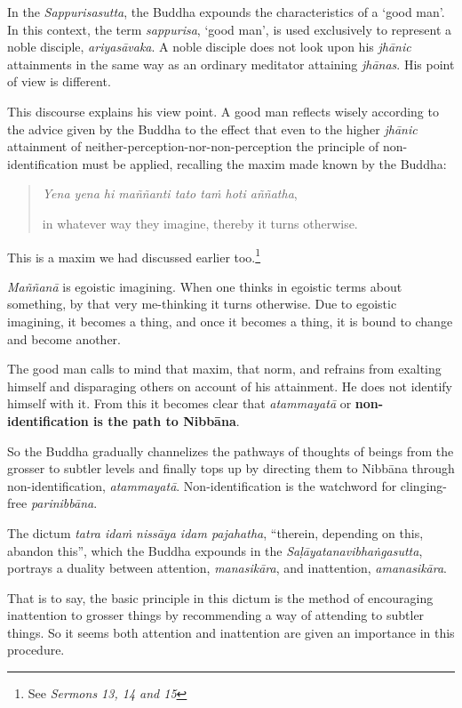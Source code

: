In the \emph{Sappurisasutta}, the Buddha expounds the characteristics of a `good man'. In this context, the term \emph{sappurisa}, `good man', is used exclusively to represent a noble disciple, \emph{ariyasāvaka}. A noble disciple does not look upon his \emph{jhānic} attainments in the same way as an ordinary meditator attaining \emph{jhānas}. His point of view is different.

This discourse explains his view point. A good man reflects wisely according to the advice given by the Buddha to the effect that even to the higher \emph{jhānic} attainment of neither-perception-nor-non-perception the principle of non-identification must be applied, recalling the maxim made known by the Buddha:

\begin{quote}
\emph{Yena yena hi maññanti tato taṁ hoti aññatha},

in whatever way they imagine, thereby it turns otherwise.
\end{quote}

This is a maxim we had discussed earlier too.\footnote{See \emph{Sermons 13, 14 and 15}}

\emph{Maññanā} is egoistic imagining. When one thinks in egoistic terms about something, by that very me-thinking it turns otherwise. Due to egoistic imagining, it becomes a thing, and once it becomes a thing, it is bound to change and become another.

The good man calls to mind that maxim, that norm, and refrains from exalting himself and disparaging others on account of his attainment. He does not identify himself with it. From this it becomes clear that \emph{atammayatā} or \textbf{non-identification is the path to Nibbāna}.

So the Buddha gradually channelizes the pathways of thoughts of beings from the grosser to subtler levels and finally tops up by directing them to Nibbāna through non-identification, \emph{atammayatā}. Non-identification is the watchword for clinging-free \emph{parinibbāna}.

The dictum \emph{tatra idaṁ nissāya idam pajahatha}, ``therein, depending on this, abandon this'', which the Buddha expounds in the \emph{Saḷāyatanavibhaṅgasutta}, portrays a duality between attention, \emph{manasikāra}, and inattention, \emph{amanasikāra}.

That is to say, the basic principle in this dictum is the method of encouraging inattention to grosser things by recommending a way of attending to subtler things. So it seems both attention and inattention are given an importance in this procedure.

